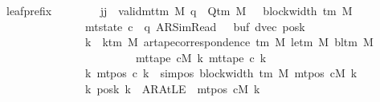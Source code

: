 \begin{isabellebody}
\ \ \ leaf{\isacharunderscore}{\kern0pt}prefix{\isacharcolon}{\kern0pt}\isanewline
\ \ \ \ \ \ \ \ {\isachardoublequoteopen}{\isasymAnd}jj{\isachardot}{\kern0pt}\ {\isasymlbrakk}\ valid{\isacharunderscore}{\kern0pt}mttm\ M{\isacharsemicolon}{\kern0pt}\ q\ {\isasymin}\ Q{\isacharunderscore}{\kern0pt}tm\ M{\isacharsemicolon}{\kern0pt}\ {}\ {\isasymle}\ block{\isacharunderscore}{\kern0pt}width\ {\isacharparenleft}{\kern0pt}{\isasymGamma}{\isacharunderscore}{\kern0pt}tm\ M{\isacharparenright}{\kern0pt}{\isacharsemicolon}{\kern0pt}\isanewline
\ \ \ \ \ \ \ \ \ \ \ \ \ \ \ \ \ mt{\isacharunderscore}{\kern0pt}state\ c{}\ {\isacharequal}{\kern0pt}\ {\isacharparenleft}{\kern0pt}q{\isacharcomma}{\kern0pt}\ AR{\isacharunderscore}{\kern0pt}SimRead{\isacharcomma}{\kern0pt}\ {}{\isacharcomma}{\kern0pt}\ {}{\isacharcomma}{\kern0pt}\ buf{}{\isacharcomma}{\kern0pt}\ dvec{\isacharcomma}{\kern0pt}\ posk{}{\isacharparenright}{\kern0pt}{\isacharsemicolon}{\kern0pt}\isanewline
\ \ \ \ \ \ \ \ \ \ \ \ \ \ \ \ \ {\isasymforall}k\ {\isacharless}{\kern0pt}\ k{\isacharunderscore}{\kern0pt}tm\ M{\isachardot}{\kern0pt}\ ar{\isacharunderscore}{\kern0pt}tape{\isacharunderscore}{\kern0pt}correspondence\ {\isacharparenleft}{\kern0pt}{\isasymGamma}{\isacharunderscore}{\kern0pt}tm\ M{\isacharparenright}{\kern0pt}\ {\isacharparenleft}{\kern0pt}le{\isacharunderscore}{\kern0pt}tm\ M{\isacharparenright}{\kern0pt}\ {\isacharparenleft}{\kern0pt}bl{\isacharunderscore}{\kern0pt}tm\ M{\isacharparenright}{\kern0pt}\isanewline
\ \ \ \ \ \ \ \ \ \ \ \ \ \ \ \ \ \ \ \ \ \ \ \ \ \ {\isacharparenleft}{\kern0pt}mt{\isacharunderscore}{\kern0pt}tape\ cM\ k{\isacharparenright}{\kern0pt}\ {\isacharparenleft}{\kern0pt}mt{\isacharunderscore}{\kern0pt}tape\ c{}\ k{\isacharparenright}{\kern0pt}{\isacharsemicolon}{\kern0pt}\isanewline
\ \ \ \ \ \ \ \ \ \ \ \ \ \ \ \ \ {\isasymAnd}k{\isachardot}{\kern0pt}\ mt{\isacharunderscore}{\kern0pt}pos\ c{}\ k\ {\isacharequal}{\kern0pt}\ sim{\isacharunderscore}{\kern0pt}pos\ {\isacharparenleft}{\kern0pt}block{\isacharunderscore}{\kern0pt}width\ {\isacharparenleft}{\kern0pt}{\isasymGamma}{\isacharunderscore}{\kern0pt}tm\ M{\isacharparenright}{\kern0pt}{\isacharparenright}{\kern0pt}\ {\isacharparenleft}{\kern0pt}mt{\isacharunderscore}{\kern0pt}pos\ cM\ k{\isacharparenright}{\kern0pt}{\isacharsemicolon}{\kern0pt}\isanewline
\ \ \ \ \ \ \ \ \ \ \ \ \ \ \ \ \ {\isasymAnd}k{\isachardot}{\kern0pt}\ posk{}\ k\ {\isacharequal}{\kern0pt}\ AR{\isacharunderscore}{\kern0pt}AtLE\ {\isasymlongleftrightarrow}\ mt{\isacharunderscore}{\kern0pt}pos\ cM\ k\ {\isacharequal}{\kern0pt}\ {}{\isacharsemicolon}{\kern0pt}\isanewline

\end{isabellebody}
